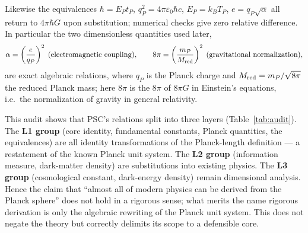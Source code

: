 \documentclass[11pt,a4paper]{article}
\begin{document}
Likewise the equivalences $\hbar = E_P t_P$, $q_P^2 = 4\pi\varepsilon_0\hbar c$, $E_P = k_B T_P$, $e = q_P\sqrt{\alpha}$ all return to $4\pi\hbar G$ upon substitution; numerical checks give zero relative difference. In particular the two dimensionless quantities used later,
\begin{equation}
\alpha = \left(\frac{e}{q_P}\right)^2 \;(\text{electromagnetic coupling}),\qquad
8\pi = \left(\frac{m_P}{M_{\rm red}}\right)^2 \;(\text{gravitational normalization}),
\label{eq:alpha8pi}
\end{equation}
are exact algebraic relations, where $q_P$ is the Planck charge and $M_{\rm red}=m_P/\sqrt{8\pi}$ the reduced Planck mass; here $8\pi$ is the $8\pi$ of $8\pi G$ in Einstein's equations, i.e.\ the normalization of gravity in general relativity.

This audit shows that PSC's relations split into three layers (Table~\ref{tab:audit}). The \textbf{L1 group} (core identity, fundamental constants, Planck quantities, the equivalences) are all identity transformations of the Planck-length definition --- a restatement of the known Planck unit system. The \textbf{L2 group} (information measure, dark-matter density) are substitutions into existing physics. The \textbf{L3 group} (cosmological constant, dark-energy density) remain dimensional analysis. Hence the claim that ``almost all of modern physics can be derived from the Planck sphere'' does not hold in a rigorous sense; what merits the name rigorous derivation is only the algebraic rewriting of the Planck unit system. This does not negate the theory but correctly delimits its scope to a defensible core.
\end{document}

